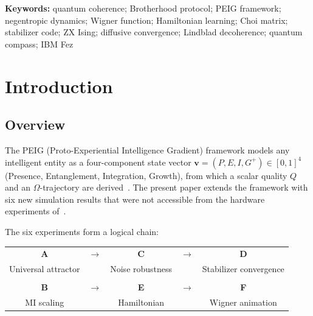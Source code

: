 \documentclass[12pt]{article}
\newcommand{\keywords}[1]{\par\noindent\textbf{Keywords:} #1\par\vspace{0.5em}}
\begin{document}
\begin{abstract}
\begin{enumerate}[leftmargin=*,itemsep=2pt]
\item \textbf{Role-asymmetric Wigner negativity (Experiment~F).}
  The Omega node Wigner negativity decays exponentially with half-life
  $\tau = 1.44$~steps, crossing the classical boundary at step~20.
  The Alpha node negativity is conserved to 4 significant figures
  ($W_{\min}(B) = -0.1131$ to $-0.1134$) throughout all 100~steps---a
  conservation law arising from the null-space resonance with $H_{\rm eff}$.
\end{enumerate}

Together these results establish the BCP as a \emph{diffusive quantum
compass}: an irreversible quantum channel that navigates two nodes toward
the Z$\otimes$X stabilizer codeword of the $[[2,0,2]]$ code, consuming
the Omega node's quantum non-classicality as thermodynamic fuel while
preserving the Alpha node's quantum identity as a conserved invariant.
\end{abstract}

\keywords{quantum coherence; Brotherhood protocol; PEIG framework;
negentropic dynamics; Wigner function; Hamiltonian learning;
Choi matrix; stabilizer code; ZX Ising; diffusive convergence;
Lindblad decoherence; quantum compass; IBM Fez}

\newpage\setcounter{page}{1}
\tableofcontents\newpage

\section{Introduction}
\label{sec:intro}

\subsection{Overview}

The PEIG (Proto-Experiential Intelligence Gradient) framework models any
intelligent entity as a four-component state vector
$\mathbf{v}=(P,E,I,G^+)\in[0,1]^4$ (Presence, Entanglement, Integration,
Growth), from which a scalar quality $Q$ and an $\Omega$-trajectory are
derived~\cite{Monette2026v1}.  The present paper extends the framework
with six new simulation results that were not accessible from the hardware
experiments of~\cite{Monette2026v1}.

The six experiments form a logical chain:

\begin{center}
\begin{tabular}{ccccc}
\textbf{A} & $\rightarrow$ & \textbf{C} & $\rightarrow$ & \textbf{D}\\
Universal attractor & & Noise robustness & & Stabilizer convergence\\
& & & &\\
\textbf{B} & $\rightarrow$ & \textbf{E} & $\rightarrow$ & \textbf{F}\\
MI scaling & & Hamiltonian & & Wigner animation
\end{tabular}
\end{center}
\end{document}
